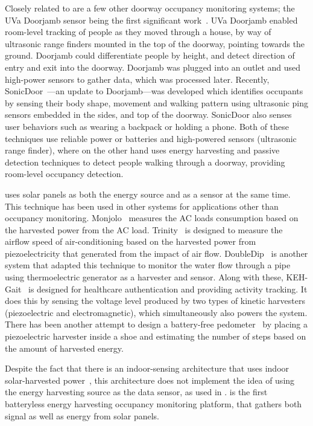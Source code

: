 Closely related to \sysname are a few other doorway occupancy monitoring systems; the UVa Doorjamb sensor being the first significant work~\cite{hnat2012doorjamb}.
UVa Doorjamb enabled room-level tracking of people as they moved through a house, by way of ultrasonic range finders mounted in the top of the doorway, pointing towards the ground. Doorjamb could differentiate people by height, and detect direction of entry and exit into the doorway. Doorjamb was plugged into an outlet and used high-power sensors to gather data, which was processed later.
Recently, SonicDoor~\cite{sonicdoor-buildsys2017}---an update to Doorjamb---was developed which identifies occupants by sensing their body shape, movement and walking pattern using ultrasonic ping sensors embedded in the sides, and top of the doorway. SonicDoor also senses user behaviors such as wearing a backpack or holding a phone.
Both of these techniques use reliable power or batteries and high-powered sensors (ultrasonic range finder), where on the other hand \sysname uses energy harvesting and passive detection techniques to detect people walking through a doorway, providing room-level occupancy detection.

 \sysname uses solar panels as both the energy source and as a sensor at the same time. This technique has been used in other systems for applications other than occupancy monitoring. Monjolo~\cite{debruin2013monjolo} measures the AC loads consumption based on the harvested power from the AC load.  Trinity~\cite{xiang2013powering} is designed to measure the airflow speed of air-conditioning based on the harvested power from piezoelectricity that generated from the impact of air flow. DoubleDip~\cite{martin2012doubledip} is another system that adapted this technique to monitor the water flow through a pipe using thermoelectric generator as a harvester and sensor. Along with these, KEH-Gait~\cite{xu2017keh} is designed for healthcare authentication and providing activity tracking. It does this by sensing the voltage level produced by two types of kinetic harvesters (piezoelectric and electromagnetic), which simultaneously also powers the system. There has been another attempt to design a battery-free pedometer~\cite{kalantarian2016pedometers} by placing a piezoelectric harvester inside a shoe and estimating the number of steps based on the amount of harvested energy.

Despite the fact that there is an indoor-sensing architecture that uses indoor solar-harvested power~\cite{campbell2014energy}, this architecture does not implement the idea of using the energy harvesting source as the data sensor, as used in \sysname.
\sysname is the first batteryless energy harvesting occupancy monitoring platform, that gathers both signal as well as energy from solar panels.


